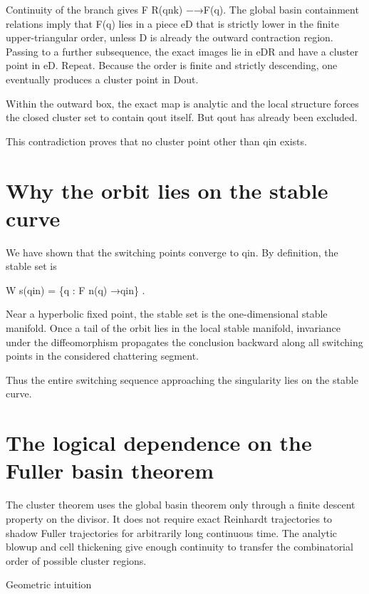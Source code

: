 Continuity of the branch gives F R(qnk) −→F(q). The global basin containment relations imply that F(q) lies in a piece eD that is strictly lower in the finite upper-triangular order, unless D is already the outward contraction region. Passing to a further subsequence, the exact images lie in eDR and have a cluster point in eD. Repeat. Because the order is finite and strictly descending, one eventually produces a cluster point in Dout.


Within the outward box, the exact map is analytic and the local structure forces the closed cluster set to contain qout itself. But qout has already been excluded.


This contradiction proves that no cluster point other than qin exists.


\section{Why the orbit lies on the stable curve}

We have shown that the switching points converge to qin. By definition, the stable set is


\begin{displaytext}
W s(qin) = \{q : F n(q) →qin\} .
\end{displaytext}

Near a hyperbolic fixed point, the stable set is the one-dimensional stable manifold. Once a tail of the orbit lies in the local stable manifold, invariance under the diffeomorphism propagates the conclusion backward along all switching points in the considered chattering segment.


Thus the entire switching sequence approaching the singularity lies on the stable curve.


\section{The logical dependence on the Fuller basin theorem}

The cluster theorem uses the global basin theorem only through a finite descent property on the divisor. It does not require exact Reinhardt trajectories to shadow Fuller trajectories for arbitrarily long continuous time. The analytic blowup and cell thickening give enough continuity to transfer the combinatorial order of possible cluster regions.


\begin{insightbox}{Geometric intuition}
\end{insightbox}

